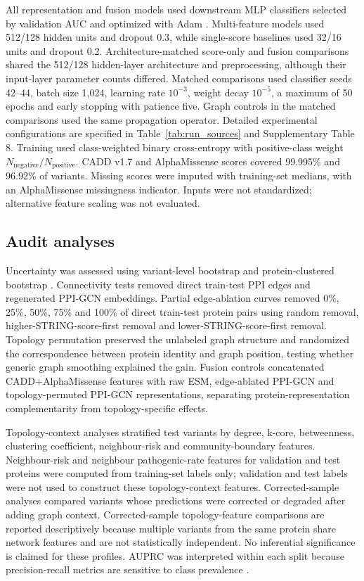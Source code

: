 \documentclass[conference]{IEEEtran}
\newcommand{\CADDAM}{CADD\allowbreak{}+\allowbreak{}AlphaMissense}
\begin{document}
All representation and fusion models used downstream MLP classifiers selected by validation AUC and optimized with Adam \cite{Kingma2015Adam}. Multi-feature models used 512/128 hidden units and dropout 0.3, while single-score baselines used 32/16 units and dropout 0.2. Architecture-matched score-only and fusion comparisons shared the 512/128 hidden-layer architecture and preprocessing, although their input-layer parameter counts differed. Matched comparisons used classifier seeds 42--44, batch size 1,024, learning rate $10^{-3}$, weight decay $10^{-5}$, a maximum of 50 epochs and early stopping with patience five. Graph controls in the matched comparisons used the same propagation operator. Detailed experimental configurations are specified in Table~\ref{tab:run_sources} and Supplementary Table 8. Training used class-weighted binary cross-entropy with positive-class weight $N_{\mathrm{negative}}/N_{\mathrm{positive}}$. CADD v1.7 and AlphaMissense scores \cite{Kircher2014CADD,Schubach2024CADDv17,Cheng2023AlphaMissense} covered 99.995\% and 96.92\% of variants. Missing scores were imputed with training-set medians, with an AlphaMissense missingness indicator. Inputs were not standardized; alternative feature scaling was not evaluated.

\subsection{Audit analyses}

Uncertainty was assessed using variant-level bootstrap and protein-clustered bootstrap \cite{Efron1993Bootstrap}. Connectivity tests removed direct train-test PPI edges and regenerated PPI-GCN embeddings. Partial edge-ablation curves removed 0\%, 25\%, 50\%, 75\% and 100\% of direct train-test protein pairs using random removal, higher-STRING-score-first removal and lower-STRING-score-first removal. Topology permutation preserved the unlabeled graph structure and randomized the correspondence between protein identity and graph position, testing whether generic graph smoothing explained the gain. Fusion controls concatenated \CADDAM{} features with raw ESM, edge-ablated PPI-GCN and topology-permuted PPI-GCN representations, separating protein-representation complementarity from topology-specific effects.

Topology-context analyses stratified test variants by degree, k-core, betweenness, clustering coefficient, neighbour-risk and community-boundary features. Neighbour-risk and neighbour pathogenic-rate features for validation and test proteins were computed from training-set labels only; validation and test labels were not used to construct these topology-context features. Corrected-sample analyses compared variants whose predictions were corrected or degraded after adding graph context. Corrected-sample topology-feature comparisons are reported descriptively because multiple variants from the same protein share network features and are not statistically independent. No inferential significance is claimed for these profiles. AUPRC was interpreted within each split because precision-recall metrics are sensitive to class prevalence \cite{Saito2015PrecisionRecall}.
\end{document}
